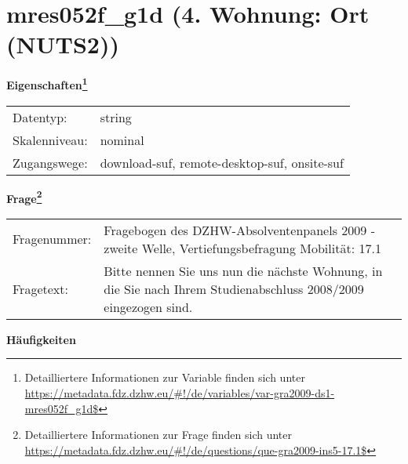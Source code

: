 
    \setcounter{footnote}{0}

    \vspace*{-1.8cm}
	\section{mres052f\_g1d (4. Wohnung: Ort (NUTS2))}
	\label{section:mres052f_g1d}



    \vspace*{0.5cm}
    \noindent\textbf{Eigenschaften\footnote{Detailliertere Informationen zur Variable finden sich unter
		\url{https://metadata.fdz.dzhw.eu/\#!/de/variables/var-gra2009-ds1-mres052f_g1d$}}}\\
	\begin{tabularx}{\hsize}{@{}lX}
	Datentyp: & string \\
	Skalenniveau: & nominal \\
	Zugangswege: &
	  download-suf, 
	  remote-desktop-suf, 
	  onsite-suf
 \\
    \end{tabularx}



				\vspace*{0.5cm}
                \noindent\textbf{Frage\footnote{Detailliertere Informationen zur Frage finden sich unter
		              \url{https://metadata.fdz.dzhw.eu/\#!/de/questions/que-gra2009-ins5-17.1$}}}\\
				\begin{tabularx}{\hsize}{@{}lX}
					Fragenummer: &
					  Fragebogen des DZHW-Absolventenpanels 2009 - zweite Welle, Vertiefungsbefragung Mobilität:
					  17.1
 \\
					Fragetext: & Bitte nennen Sie uns nun die nächste Wohnung, in die Sie nach Ihrem Studienabschluss 2008/2009 eingezogen sind. \\
				\end{tabularx}





        		\vspace*{0.5cm}
                \noindent\textbf{Häufigkeiten}

